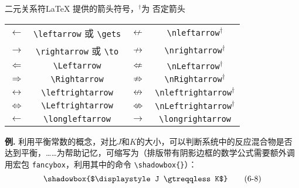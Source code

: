 \documentclass[mathserif]{beamer}
\newcommand{\codegreen}[1]{\textcolor{codegreen}{#1}}
\newenvironment{instance}{\zihao{-5}\textbf{\songti \codegreen{例.}}}{\hfill\par}
\begin{document}
\begin{frame}[fragile]{二元关系符}{\LaTeX{} 提供的箭头符号，$^{\dagger}$为 \AmS{} 否定箭头}
\begin{table}[H]
\centering
\begin{tabular}{cc|cc}
	\toprule
	$\gets$ & \lstinline'\leftarrow' 或 \lstinline'\gets' & $\nleftarrow$ & \lstinline'\nleftarrow'$^{\dagger}$ \\
	$\to$ & \lstinline'\rightarrow' 或 \lstinline'\to' & $\nrightarrow$ & \lstinline'\nrightarrow'$^{\dagger}$ \\
	$\Leftarrow$ & \lstinline'\Leftarrow' & $\nLeftarrow$ & \lstinline'\nLeftarrow'$^{\dagger}$ \\
	$\Rightarrow$ & \lstinline'\Rightarrow' & $\nRightarrow$ & \lstinline'\nRightarrow'$^{\dagger}$ \\
	$\leftrightarrow$ & \lstinline'\leftrightarrow' & $\nleftrightarrow$ & \lstinline'\nleftrightarrow'$^{\dagger}$ \\
	$\Leftrightarrow$ & \lstinline'\Leftrightarrow' & $\nLeftrightarrow$ & \lstinline'\nLeftrightarrow'$^{\dagger}$ \\
	$\longleftarrow$ & \lstinline'\longleftarrow' & $\longrightarrow$ & \lstinline'\longrightarrow' \\
	\bottomrule
\end{tabular}
\end{table}
\begin{instance}
	\cite{无机化学}利用平衡常数的概念，对比$J$和$K$的大小，可以判断系统中的反应混合物是否达到平衡，……为帮助记忆，可缩写为（排版带有阴影边框的数学公式需要额外调用宏包 \verb'fancybox'，利用其中的命令 \lstinline'\shadowbox{}'）：
\begin{equation*}
	\shadowbox{$\displaystyle J \gtreqqless K$} \tag{6-8}
\end{equation*}
\end{instance}
\end{frame}
\end{document}
